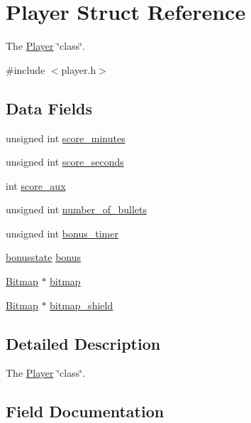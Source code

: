 \hypertarget{struct_player}{}\section{Player Struct Reference}
\label{struct_player}


The \hyperlink{struct_player}{Player} \char`\"{}class\char`\"{}.  




{\ttfamily \#include $<$player.\+h$>$}

\subsection*{Data Fields}
\begin{DoxyCompactItemize}
\item 
unsigned int \hyperlink{struct_player_a9ebf860aa3d67f9f3229afa365dbd2df}{score\+\_\+minutes}
\item 
unsigned int \hyperlink{struct_player_ac5b57794eda52960699e7304de9ed640}{score\+\_\+seconds}
\item 
int \hyperlink{struct_player_aa7c2d82515de928df40dec915c3ba081}{score\+\_\+aux}
\item 
unsigned int \hyperlink{struct_player_a391d726f640974bcd70eeba097a92ebf}{number\+\_\+of\+\_\+bullets}
\item 
unsigned int \hyperlink{struct_player_a0b2f5a7e6b082f9f828b559d165ac60f}{bonus\+\_\+timer}
\item 
\hyperlink{group__player_ga3ab4abfc8d967315be3486178b91d2d9}{bonusstate} \hyperlink{struct_player_ad071f1edf847f7378f6161c02ba70640}{bonus}
\item 
\hyperlink{struct_bitmap}{Bitmap} $\ast$ \hyperlink{struct_player_a00c870e2cedff0b231b1c8ad85019f66}{bitmap}
\item 
\hyperlink{struct_bitmap}{Bitmap} $\ast$ \hyperlink{struct_player_adb5f5a8861d7950622a415e122e4e6d7}{bitmap\+\_\+shield}
\end{DoxyCompactItemize}


\subsection{Detailed Description}
The \hyperlink{struct_player}{Player} \char`\"{}class\char`\"{}. 

\subsection{Field Documentation}
\hypertarget{struct_player_a00c870e2cedff0b231b1c8ad85019f66}{}\label{struct_player_a00c870e2cedff0b231b1c8ad85019f66} 

